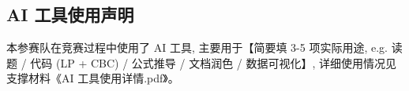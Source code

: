 
\subsection*{AI 工具使用声明}



本参赛队在竞赛过程中使用了 AI 工具, 主要用于【简要填 3-5 项实际用途, e.g. 读题 / 代码 (LP + CBC) / 公式推导 / 文档润色 / 数据可视化】, 详细使用情况见支撑材料《AI 工具使用详情.pdf》。


